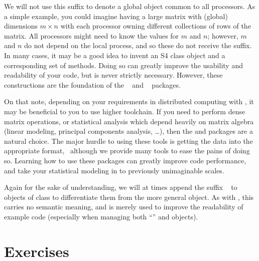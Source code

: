 We will not use this suffix to denote a global object common to all processors.
As a simple example, you could imagine having a large matrix with (global)
dimensions $m\times n$ with each processor owning different collections of
rows of the matrix. All processors might need to know the values for
$m$ and $n$; however, $m$ and $n$ do not depend on the local process, and
so these do not receive the  suffix. In many cases, it may be
a good idea to invent an S4 class object and a corresponding set of methods.
Doing so can greatly improve the usability and readability of your code, but
is never strictly necessary. However, these constructions are the foundation
of the
~\citep{Schmidt2012pbdBASEpackage} and
~\citep{Schmidt2012pbdDMATpackage} packages.

On that note, depending on your requirements in distributed computing
with , it may be beneficial to you to use higher
 toolchain.  If you need to perform dense matrix operations,
or statistical analysis which depend heavily on matrix algebra (linear
modeling, principal components analysis, \dots), then the 
and  packages are a natural choice. The major hurdle to using
these tools is getting the data into the appropriate
 format,~ although we provide
many tools to ease the pains of doing so. Learning how to use these packages
can greatly improve code performance, and take your statistical modeling
in  to previously unimaginable scales.

Again for the sake of understanding, we will at times append the suffix
~ to objects of class
 to differentiate them from the
more general  object.  As with , this carries no
semantic meaning, and is merely used to improve the readability of example
code (especially when managing both ``'' and 
objects).




\section{Exercises}
\label{sec:background}

